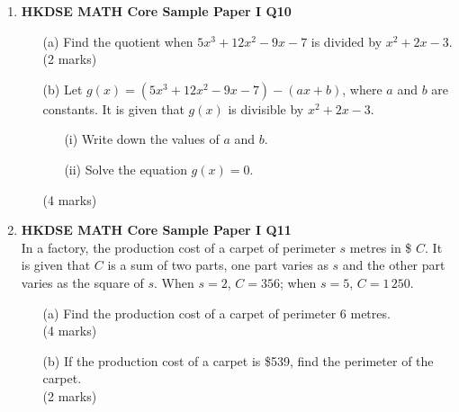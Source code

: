 \documentclass[12pt]{article}
\begin{document}
\begin{enumerate}
	\item \textbf{HKDSE MATH Core Sample Paper I Q10}
	\begin{enumerate}
		\item[(a)] Find the quotient when $5x^3 + 12x^2 - 9x - 7$ is divided by $x^2+2x-3$. \\(2 marks)
		\item[(b)] Let $g(x) = (5x^3 + 12x^2 - 9x - 7) - (ax+b)$, where $a$ and $b$ are constants. It is given that $g(x)$ is divisible by $x^2+2x-3$.
		\begin{enumerate}
			\item[(i)] Write down the values of $a$ and $b$.
			\item[(ii)] Solve the equation $g(x) = 0$.
		\end{enumerate}
		(4 marks)
	\end{enumerate} 

	\item \textbf{HKDSE MATH Core Sample Paper I Q11}\\
	In a factory, the production cost of a carpet of perimeter $s$ metres in \$ $C$. It is given that $C$ is a sum of two parts, one part varies as $s$ and the other part varies as the square of $s$. When $s = 2$, $C = 356$; when $s = 5$, $C = 1\,250$.
	\begin{enumerate}
		\item[(a)] Find the production cost of a carpet of perimeter 6 metres. \\(4 marks)
		\item[(b)] If the production cost of a carpet is \$539, find the perimeter of the carpet. \\(2 marks)
	\end{enumerate}


\end{enumerate}
\end{document}
